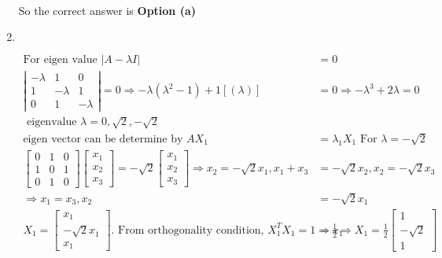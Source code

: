 \begin{enumerate}
\begin{answer}
\begin{align*}
		\end{align*}
			So the correct answer is \textbf{Option (a)}
	\end{answer}
	\item $\left. \right. $
	\begin{answer}
		\begin{align*}
		 \text{For eigen value }|A-\lambda I|&=0\\
		\left|\begin{array}{ccc}
		-\lambda & 1 & 0 \\
		1 & -\lambda & 1 \\
		0 & 1 & -\lambda
		\end{array}\right|=0 \Rightarrow-\lambda\left(\lambda^{2}-1\right)+1[(\lambda)]&=0 \Rightarrow-\lambda^{3}+2 \lambda=0\\
	\text{	eigenvalue }\lambda=0, \sqrt{2},-\sqrt{2}\\
		\text{eigen vector can be determine by }A X_{1}&=\lambda_{1} X_{1}
	\text{	For }\lambda=-\sqrt{2}\\
		\left[\begin{array}{lll}
		0 & 1 & 0 \\
		1 & 0 & 1 \\
		0 & 1 & 0
		\end{array}\right]\left[\begin{array}{l}
		x_{1} \\
		x_{2} \\
		x_{3}
		\end{array}\right]=-\sqrt{2}\left[\begin{array}{l}
		x_{1} \\
		x_{2} \\
		x_{3}
		\end{array}\right] \Rightarrow x_{2}=-\sqrt{2} x_{1}, x_{1}+x_{3}&=-\sqrt{2} x_{2}, x_{2}=-\sqrt{2} x_{3}\\
		\Rightarrow x_{1}=x_{3}, x_{2}&=-\sqrt{2} x_{1}\\
		X_{1}=\left[\begin{array}{c}x_{1} \\ -\sqrt{2} x_{1} \\ x_{1}\end{array}\right] \text{. From orthogonality condition, }X_{1}^{T} X_{1}=1 \Rightarrow x_{1}&=\frac{1}{2} \Rightarrow X_{1}=\frac{1}{2}\left[\begin{array}{c}1 \\ -\sqrt{2} \\ 1\end{array}\right]\\

\end{align*}
\end{answer}
\end{enumerate}
